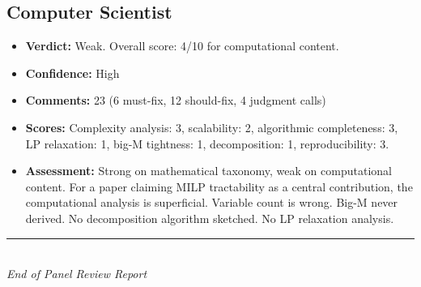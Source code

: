 \documentclass[11pt,a4paper]{article}
\begin{document}
\subsection{Computer Scientist}
\begin{itemize}[nosep,leftmargin=1.5em]
  \item \textbf{Verdict:} Weak. Overall score: 4/10 for computational content.
  \item \textbf{Confidence:} High
  \item \textbf{Comments:} 23 (6 must-fix, 12 should-fix, 4 judgment calls)
  \item \textbf{Scores:} Complexity analysis: 3, scalability: 2, algorithmic completeness: 3, LP relaxation: 1, big-M tightness: 1, decomposition: 1, reproducibility: 3.
  \item \textbf{Assessment:} Strong on mathematical taxonomy, weak on computational content. For a paper claiming MILP tractability as a central contribution, the computational analysis is superficial. Variable count is wrong. Big-M never derived. No decomposition algorithm sketched. No LP relaxation analysis.
\end{itemize}

\bigskip
\begin{center}
\rule{0.5\textwidth}{0.4pt}\\[6pt]
\textit{End of Panel Review Report}
\end{center}
\end{document}

